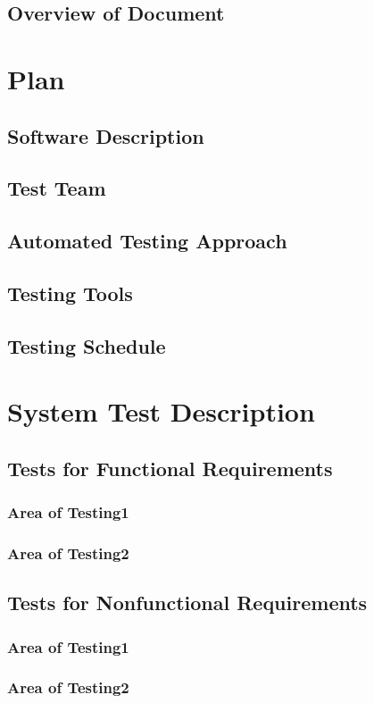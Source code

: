 \documentclass{article}
\begin{document}
\subsection{Overview of Document}

\section{Plan}
\subsection{Software Description}
\subsection{Test Team}
\subsection{Automated Testing Approach}
\subsection{Testing Tools}
\subsection{Testing Schedule}

\section{System Test Description}
\subsection{Tests for Functional Requirements}
\subsubsection{Area of Testing1}
\subsubsection{Area of Testing2}
\subsection{Tests for Nonfunctional Requirements}
\subsubsection{Area of Testing1}
\subsubsection{Area of Testing2}
\end{document}
